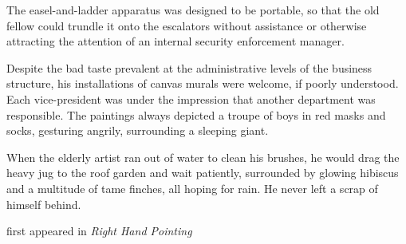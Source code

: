 The easel-and-ladder apparatus was designed to be portable, so that the
old fellow could trundle it onto the escalators without assistance or
otherwise attracting the attention of an internal security enforcement
manager.

Despite the bad taste prevalent at the administrative levels of the
business structure, his installations of canvas murals were welcome, if
poorly understood. Each vice-president was under the impression that
another department was responsible. The paintings always depicted a
troupe of boys in red masks and socks, gesturing angrily, surrounding a
sleeping giant.

When the elderly artist ran out of water to clean his brushes, he would
drag the heavy jug to the roof garden and wait patiently, surrounded by
glowing hibiscus and a multitude of tame finches, all hoping for rain.
He never left a scrap of himself behind.

first appeared in \emph{Right Hand Pointing}
